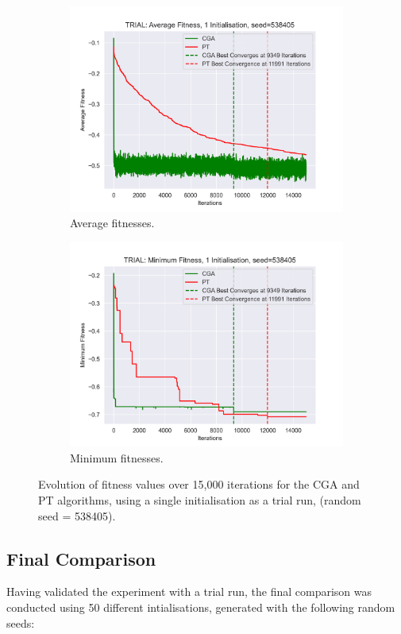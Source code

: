 \documentclass[10pt]{article}
\begin{document}
\begin{multicols}{2}
\begin{figure}[H]
    \centering
    \begin{subfigure}{0.48\textwidth}
        \includegraphics[width=\textwidth]{../figures/Final Comparison/CGA vs PT Average Fitness TRIAL.png}
        \caption{Average fitnesses.}
        \label{fig:AVG_trial_fitness}
    \end{subfigure}
    \begin{subfigure}{0.48\textwidth}
        \includegraphics[width=\textwidth]{../figures/Final Comparison/CGA vs PT Minimum Fitness TRIAL.png}
        \caption{Minimum fitnesses.}
        \label{fig:MIN_trial_fitness}
    \end{subfigure}
\captionsetup{justification=centering}
\caption{Evolution of fitness values over 15,000 iterations for the CGA and PT algorithms, using a single initialisation as a trial run, (random seed = 538405).}
\label{fig:trial_fitness}
\end{figure}

\subsection{Final Comparison}
Having validated the experiment with a trial run, the final comparison was conducted using 50 different intialisations, generated with the following random seeds:

\end{multicols}
\end{document}
